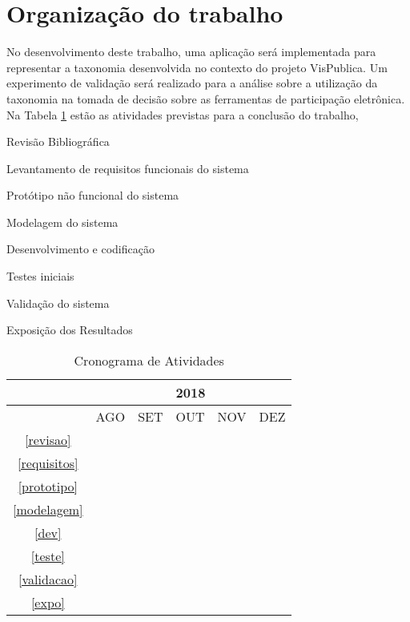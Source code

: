 \section{Organização do trabalho}
\label{sec:organizacao}
No desenvolvimento deste trabalho, uma aplicação será implementada para representar a taxonomia desenvolvida no contexto do projeto VisPublica.
Um experimento de validação será realizado para a análise sobre a utilização da taxonomia na tomada de decisão sobre as ferramentas de participação eletrônica.
Na Tabela \ref{tab:cronograma} estão as atividades previstas para a conclusão do trabalho, 
\begin{enumerate}
    \begin{singlespace}
    \fontsize{10}{12}\selectfont 
    \item\label{revisao}Revisão Bibliográfica
    \item\label{requisitos} Levantamento de requisitos funcionais do sistema
    \item\label{prototipo} Protótipo não funcional do sistema
    \item\label{modelagem} Modelagem do sistema
    \item\label{dev} Desenvolvimento e codificação
    \item\label{teste} Testes iniciais
    \item\label{validacao} Validação do sistema
    \item\label{expo} Exposição dos Resultados
    \end{singlespace}
\end{enumerate}

\begin{table}[!ht]
\caption{Cronograma de Atividades}
\label{tab:cronograma}
\centering
    \begin{tabular}{|c|c|c|c|c|c|}
    \hline
    &\multicolumn{5}{c|}{2018}\\
    \hline
    &AGO&SET&OUT&NOV&DEZ\\
    \hline
    \ref{revisao}&\cellcolor{midgray}&&&&\\
    \hline
    \ref{requisitos}&\cellcolor{midgray}&\cellcolor{midgray}&&&\\
    \hline	
    \ref{prototipo}&&\cellcolor{midgray}&&&\\
    \hline			
    \ref{modelagem}&&\cellcolor{midgray}&\cellcolor{midgray}&&\\
    \hline	
    \ref{dev}&&\cellcolor{midgray}&\cellcolor{midgray}&\cellcolor{midgray}&\\
    \hline
    \ref{teste}&&&&\cellcolor{midgray}&\\
    \hline	
    \ref{validacao}&&&&\cellcolor{midgray}&\\
    \hline	
    \ref{expo}&&&&\cellcolor{midgray}&\cellcolor{midgray}\\
    \hline
    \end{tabular}
\end{table}
\vfill